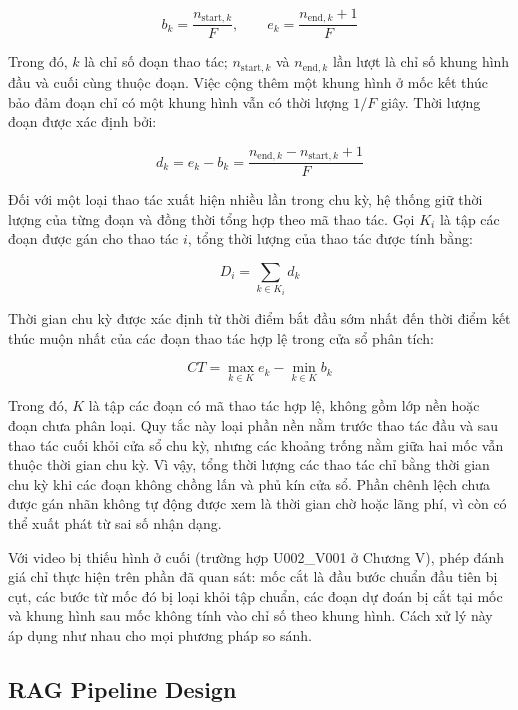 \begin{equation} b_k = \frac{n_{\text{start},k}}{F}, \qquad e_k = \frac{n_{\text{end},k} + 1}{F} \end{equation}

Trong đó, $k$ là chỉ số đoạn thao tác; $n_{\text{start},k}$ và $n_{\text{end},k}$ lần lượt là chỉ số khung hình đầu và cuối cùng thuộc đoạn. Việc cộng thêm một khung hình ở mốc kết thúc bảo đảm đoạn chỉ có một khung hình vẫn có thời lượng $1/F$ giây. Thời lượng đoạn được xác định bởi:

\begin{equation} d_k = e_k - b_k = \frac{n_{\text{end},k} - n_{\text{start},k} + 1}{F} \end{equation}

Đối với một loại thao tác xuất hiện nhiều lần trong chu kỳ, hệ thống giữ thời lượng của từng đoạn và đồng thời tổng hợp theo mã thao tác. Gọi $K_i$ là tập các đoạn được gán cho thao tác $i$, tổng thời lượng của thao tác được tính bằng:

\begin{equation} D_i = \sum_{k \in K_i} d_k \end{equation}

Thời gian chu kỳ được xác định từ thời điểm bắt đầu sớm nhất đến thời điểm kết thúc muộn nhất của các đoạn thao tác hợp lệ trong cửa sổ phân tích:

\begin{equation} CT = \max_{k \in K} e_k - \min_{k \in K} b_k \end{equation}

Trong đó, $K$ là tập các đoạn có mã thao tác hợp lệ, không gồm lớp nền hoặc đoạn chưa phân loại. Quy tắc này loại phần nền nằm trước thao tác đầu và sau thao tác cuối khỏi cửa sổ chu kỳ, nhưng các khoảng trống nằm giữa hai mốc vẫn thuộc thời gian chu kỳ. Vì vậy, tổng thời lượng các thao tác chỉ bằng thời gian chu kỳ khi các đoạn không chồng lấn và phủ kín cửa sổ. Phần chênh lệch chưa được gán nhãn không tự động được xem là thời gian chờ hoặc lãng phí, vì còn có thể xuất phát từ sai số nhận dạng.

Với video bị thiếu hình ở cuối (trường hợp U002\_V001 ở Chương V), phép đánh giá chỉ thực hiện trên phần đã quan sát: mốc cắt là đầu bước chuẩn đầu tiên bị cụt, các bước từ mốc đó bị loại khỏi tập chuẩn, các đoạn dự đoán bị cắt tại mốc và khung hình sau mốc không tính vào chỉ số theo khung hình. Cách xử lý này áp dụng như nhau cho mọi phương pháp so sánh.

\subsection{RAG Pipeline Design}


